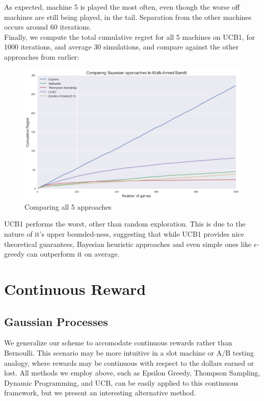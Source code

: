 \documentclass{article}
\begin{document}
As expected, machine 5 is played the most often, even though the worse off machines are still being played, in the tail. Separation from the other machines occurs around 60 iterations.\\

Finally, we compute the total cumulative regret for all 5 machines on UCB1, for 1000 iterations, and average 30 simulations, and compare against the other approaches from earlier:

\begin{figure}[H]
\centering
\includegraphics[scale=0.4]{all.png}
\caption{Comparing all 5 approaches}
\end{figure}

UCB1 performs the worst, other than random exploration. This is due to the nature of it's upper bounded-ness, suggesting that while UCB1 provides nice theoretical guarantees, Bayesian heuristic approaches and even simple ones like $\epsilon$-greedy can outperform it on average.

\section{Continuous Reward}

\subsection{Gaussian Processes}

We generalize our scheme to accomodate continuous rewards rather than Bernoulli. This scenario may be more intuitive in a slot machine or A/B testing analogy, where rewards may be continuous with respect to the dollars earned or lost. All methods we employ above, such as Epsilon Greedy, Thompson Sampling, Dynamic Programming, and UCB, can be easily applied to this continuous framework, but we present an interesting alternative method.\\
\end{document}
